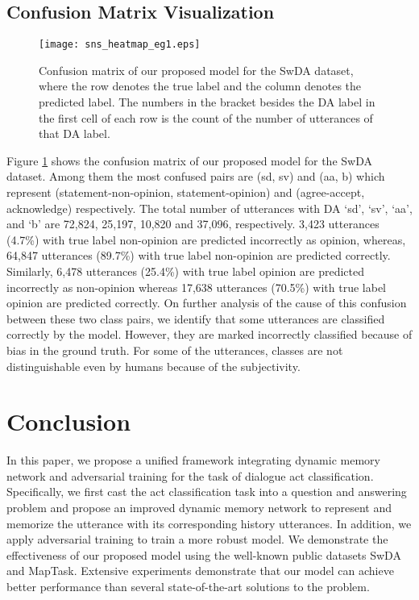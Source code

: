 \documentclass[conference]{IEEEtran}
\begin{document}
	\subsection{Confusion Matrix Visualization}
	\begin{figure}[!t]
		\centering
		\texttt{[image: sns\_heatmap\_eg1.eps]}
		\caption{Confusion matrix of our proposed model for the SwDA dataset, where the row denotes the true label and the column denotes the predicted label. The numbers in the bracket besides the DA label in the ﬁrst cell of each row is the count of the number of utterances of that DA label.}
		\label{fig:sns_heatmap_eg1}
	\end{figure}
	Figure \ref{fig:sns_heatmap_eg1} shows the confusion matrix of our proposed model for the SwDA dataset. Among them the most confused pairs are (sd, sv) and (aa, b) which represent (statement-non-opinion, statement-opinion) and (agree-accept, acknowledge) respectively. The total number of utterances with DA `sd', `sv', `aa', and `b' are 72,824, 25,197, 10,820 and 37,096, respectively.  3,423 utterances (4.7\%) with true label non-opinion are predicted incorrectly as opinion, whereas, 64,847 utterances (89.7\%) with true label non-opinion are predicted correctly. Similarly, 6,478 utterances (25.4\%) with true label opinion are predicted incorrectly as non-opinion whereas 17,638 utterances (70.5\%) with true label opinion are predicted correctly. On further analysis of the cause of this confusion between these two class pairs, we identify that some utterances are classified correctly by the model. However, they are marked incorrectly classified because of bias in the ground truth. For some of the utterances, classes are not distinguishable even by humans because of the subjectivity.
	
	\section{Conclusion}\label{sec_conclusion}In this paper, we propose a unified framework integrating dynamic memory network and adversarial training for the task of dialogue act classification. Specifically, we first cast the act classification task into a question and answering problem and propose an improved dynamic memory network to represent and memorize the utterance with its corresponding history utterances. In addition, we apply adversarial training to train a more robust model. We demonstrate the effectiveness of our proposed model using the well-known public datasets SwDA and MapTask. Extensive experiments demonstrate that our model can achieve better performance than several state-of-the-art solutions to the problem.
\end{document}
